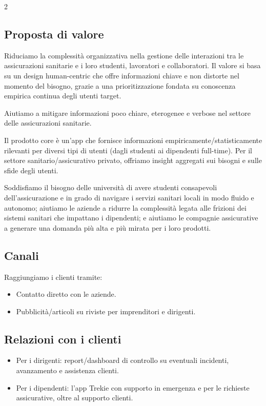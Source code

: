 \documentclass[10pt,a4paper]{scrartcl}
\begin{document}
\begin{multicols*}{2}
\subsection*{Proposta di valore}
Riduciamo la complessità organizzativa nella gestione delle interazioni tra le assicurazioni sanitarie e i loro studenti, lavoratori e collaboratori. Il valore si basa su un design human-centric che offre informazioni chiave e non distorte nel momento del bisogno, grazie a una prioritizzazione fondata su conoscenza empirica continua degli utenti target.

Aiutiamo a mitigare informazioni poco chiare, eterogenee e verbose nel settore delle assicurazioni sanitarie.

Il prodotto core è un’app che fornisce informazioni empiricamente/statisticamente rilevanti per diversi tipi di utenti (dagli studenti ai dipendenti full-time). Per il settore sanitario/assicurativo privato, offriamo insight aggregati sui bisogni e sulle sfide degli utenti.

Soddisfiamo il bisogno delle università di avere studenti consapevoli dell’assicurazione e in grado di navigare i servizi sanitari locali in modo fluido e autonomo; aiutiamo le aziende a ridurre la complessità legata alle frizioni dei sistemi sanitari che impattano i dipendenti; e aiutiamo le compagnie assicurative a generare una domanda più alta e più mirata per i loro prodotti.

\subsection*{Canali}
Raggiungiamo i clienti tramite:
\begin{itemize}
  \item Contatto diretto con le aziende.
  \item Pubblicità/articoli su riviste per imprenditori e dirigenti.
\end{itemize}

\subsection*{Relazioni con i clienti}
\begin{itemize}
  \item Per i dirigenti: report/dashboard di controllo su eventuali incidenti, avanzamento e assistenza clienti.
  \item Per i dipendenti: l’app Trekie con supporto in emergenza e per le richieste assicurative, oltre al supporto clienti.
\end{itemize}


\end{multicols*}
\end{document}
